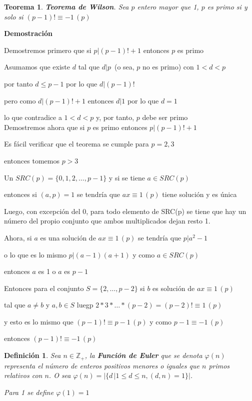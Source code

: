 \documentclass[a4paper,12pt]{report}
\newtheorem*{teo}{Teorema}
\newtheorem*{dfn}{Definición}
\begin{document}
 
 
 \begin{teo}
  \textbf{Teorema de Wilson}. Sea $p$ entero mayor que 1, $p$ es primo si y solo si $(p-1)!\equiv -1\, (p)$
 \end{teo}
 
 \textbf{Demostración}
 
 Demostremos primero que si $p|(p-1)! + 1$ entonces $p$ es primo
 
 Asumamos que existe $d$ tal que $d|p$~(o sea, $p$ no es primo) con $1<d<p$
 
 por tanto $d\leq p-1$ por lo que $d|(p-1)!$
 
 pero como $d|(p-1)!+1$ entonces $d|1$ por lo que $d=1$ 
 
 lo que contradice a $1<d<p$ y, por tanto, $p$ debe ser primo\\
 
 Demostremos ahora que si $p$ es primo entonces $p|(p-1)! + 1$
 
 Es fácil verificar que el teorema se cumple para $p=2,3$ 
 
 entonces tomemos $p>3$
 
 Un $SRC(p)=\{0,1,2,\dots,p-1\}$ y si se tiene $a\in SRC(p)$ 
 
 entonces si $(a,p)=1$  se tendría que $ax\equiv 1\, (p)$ tiene solución y es única
 
 Luego, con excepción del 0, para todo elemento de SRC(p) se tiene que hay un número del propio 
 conjunto que ambos multiplicados dejan resto 1.
 
 Ahora, si $a$ es una solución de $ax\equiv 1\, (p)$ se tendría que $p|a^2-1$ 
 
 o lo que es lo mismo $p|(a-1)(a+1)$ y como $a\in SRC(p)$  
 
 entonces $a$ es 1 o $a$ es $p-1$
 
 Entonces para el conjunto $S=\{2,\dots,p-2\}$ si $b$ es solución de $ax\equiv 1\, (p)$
 
 tal que $a\neq b$ y $a,b\in S$ luegp $2*3*\dots * (p-2)=(p-2)!\equiv 1 \, (p)$
 
 y esto es lo mismo que $(p-1)!\equiv p-1 \, (p)$ y como $p-1\equiv -1 \, (p)$
 
 entonces $(p-1)!\equiv -1 \, (p)$

 \begin{dfn}
  Sea $n\in \mathbb{Z}_+$, la \textbf{Función de Euler} que se denota $\varphi(n)$ representa el número de enteros positivos menores o iguales que $n$ primos relativos con $n$. O sea $\varphi(n)=|\{d\, |1\leq d \leq n,(d,n)=1\}|$.

  Para 1 se define $\varphi(1)=1$
 \end{dfn}
\end{document}

